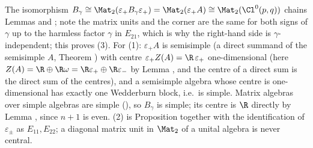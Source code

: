 The isomorphism $B_\gamma \cong \Mat_2(\varepsilon_+ B_\gamma \varepsilon_+) = \Mat_2(\varepsilon_+ A) \cong \Mat_2(\Cl^0(p,q))$ chains Lemmas  and ; note the matrix units and the corner are the same for both signs of $\gamma$ up to the harmless factor $\gamma$ in $E_{21}$, which is why the right-hand side is $\gamma$-independent; this proves (3). For (1): $\varepsilon_+ A$ is semisimple (a direct summand of the semisimple $A$, Theorem ) with centre $\varepsilon_+ Z(A) = \R\,\varepsilon_+$ one-dimensional (here $Z(A) = \R \oplus \R\omega = \R\varepsilon_+ \oplus \R\varepsilon_-$ by Lemma , and the centre of a direct sum is the direct sum of the centres), and a semisimple algebra whose centre is one-dimensional has exactly one Wedderburn block, i.e.\ is simple. Matrix algebras over simple algebras are simple (), so $B_\gamma$ is simple; its centre is $\R$ directly by Lemma , since $n + 1$ is even. (2) is Proposition  together with the identification of $\varepsilon_\pm$ as $E_{11}, E_{22}$; a diagonal matrix unit in $\Mat_2$ of a unital algebra is never central.
